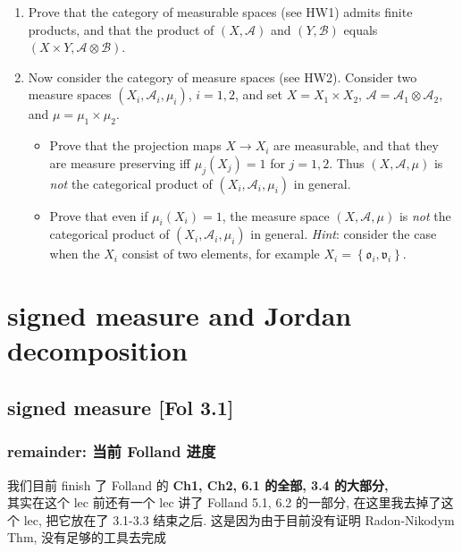 \documentclass{qlnotes-export}
\begin{document}
\begin{enumerate}
\item
  Prove that the category of measurable spaces (see HW1) admits finite products, and that the product of \((X,\mathcal{A})\) and \((Y,\mathcal{B})\) equals \((X \times Y,\mathcal{A} \otimes \mathcal{B})\).
\item
  Now consider the category of measure spaces (see HW2). Consider two measure spaces \((X_{i},\mathcal{A}_{i},\mu_{i})\), \(i = 1,2\), and set \(X = X_{1} \times X_{2}\), \(\mathcal{A} = \mathcal{A}_{1} \otimes \mathcal{A}_{2}\), and \(\mu = \mu_{1} \times \mu_{2}\).

  \begin{itemize}
  \item
    Prove that the projection maps \(X\rightarrow X_{i}\) are measurable, and that they are measure preserving iff \(\mu_{j}(X_{j}) = 1\) for \(j = 1,2\). Thus \((X,\mathcal{A},\mu)\) is \emph{not} the categorical product of \((X_{i},\mathcal{A}_{i},\mu_{i})\) in general.
  \item
    Prove that even if \(\mu_{i}(X_{i}) = 1\), the measure space \((X,\mathcal{A},\mu)\) is \emph{not} the categorical product of \((X_{i},\mathcal{A}_{i},\mu_{i})\) in general. \emph{Hint}: consider the case when the \(X_{i}\) consist of two elements, for example \(X_{i} = \left\{ {{\mathfrak{o}}_{i},{\mathfrak{v}}_{i}} \right\}\).
  \end{itemize}
\end{enumerate}

\chapter{signed measure and Jordan decomposition}\label{signed-measure-and-jordan-decomposition}

\section{signed measure {[}Fol 3.1{]}}

\subsection{remainder: 当前 Folland 进度}\label{remainder-ux5f53ux524d-folland-ux8fdbux5ea6}

我们目前 finish 了 Folland 的 \textbf{Ch1, Ch2, 6.1 的全部, 3.4 的大部分,}\\
其实在这个 lec 前还有一个 lec 讲了 Folland 5.1, 6.2 的一部分, 在这里我去掉了这个 lec, 把它放在了 3.1-3.3 结束之后. 这是因为由于目前没有证明 Radon-Nikodym Thm, 没有足够的工具去完成
\end{document}
